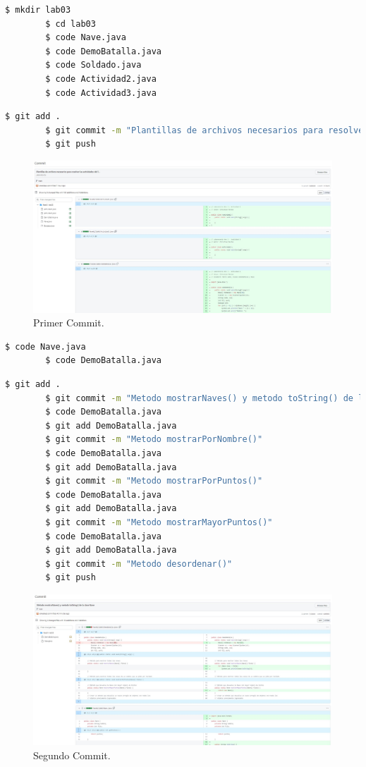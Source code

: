 \documentclass{article}
\begin{document}
\begin{lstlisting}[language=bash,caption={Creando plantillas}]
		$ mkdir lab03
		$ cd lab03
		$ code Nave.java
		$ code DemoBatalla.java
		$ code Soldado.java
		$ code Actividad2.java
		$ code Actividad3.java
	\end{lstlisting}
\begin{lstlisting}[language=bash,caption={Primer Commit / Plantillas}]
		$ git add .
		$ git commit -m "Plantillas de archivos necesarios para resolver las actividades del laboratorio"
		$ git push
	\end{lstlisting}
\begin{figure}[H]
	\centering
	\includegraphics[width=1\textwidth,keepaspectratio]{img/commit01.jpg}
	\caption{Primer Commit.}
\end{figure}
\begin{lstlisting}[language=bash,caption={Actualizando Nave.java y DemoBatalla.java}]
		$ code Nave.java
		$ code DemoBatalla.java
	\end{lstlisting}
\begin{lstlisting}[language=bash,caption={Segundo - Sexto Commit / Nave.java y DemoBatalla.java}]
		$ git add .
		$ git commit -m "Metodo mostrarNaves() y metodo toString() de la clase Nave"
		$ code DemoBatalla.java
		$ git add DemoBatalla.java
		$ git commit -m "Metodo mostrarPorNombre()"
		$ code DemoBatalla.java
		$ git add DemoBatalla.java
		$ git commit -m "Metodo mostrarPorPuntos()"
		$ code DemoBatalla.java
		$ git add DemoBatalla.java
		$ git commit -m "Metodo mostrarMayorPuntos()"
		$ code DemoBatalla.java
		$ git add DemoBatalla.java
		$ git commit -m "Metodo desordenar()"
		$ git push
	\end{lstlisting}
\begin{figure}[H]
	\centering
	\includegraphics[width=1\textwidth,keepaspectratio]{img/commit02.jpg}
	\caption{Segundo Commit.}
\end{figure}
\end{document}
